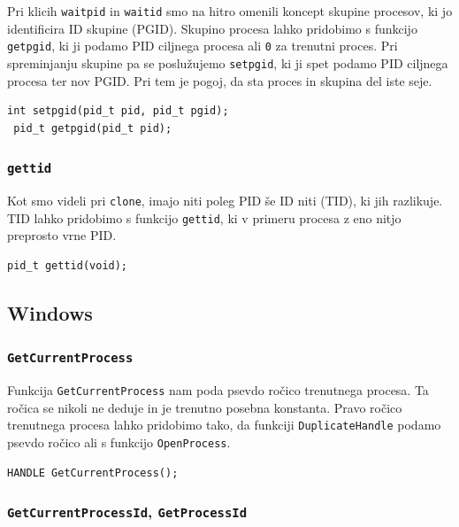 \documentclass[a4paper,12pt,openright]{book}
\begin{document}
Pri klicih \texttt{waitpid} in \texttt{waitid} smo na hitro omenili koncept skupine procesov, ki jo identificira ID skupine (PGID).
Skupino procesa lahko pridobimo s funkcijo \texttt{getpgid}, ki ji podamo PID ciljnega procesa ali \texttt{0} za trenutni proces.
Pri spreminjanju skupine pa se poslužujemo \texttt{setpgid}, ki ji spet podamo PID ciljnega procesa ter nov PGID.
Pri tem je pogoj, da sta proces in skupina del iste seje.

\begin{lstlisting}[style=func]
 int setpgid(pid_t pid, pid_t pgid);
 pid_t getpgid(pid_t pid);
\end{lstlisting}

\subsubsection{\texttt{gettid}}

Kot smo videli pri \texttt{clone}, imajo niti poleg PID še ID niti (TID), ki jih razlikuje.
TID lahko pridobimo s funkcijo \texttt{gettid}, ki v primeru procesa z eno nitjo preprosto vrne PID.

\begin{lstlisting}[style=func]
 pid_t gettid(void);
\end{lstlisting}

\subsection{Windows}


\subsubsection{\texttt{GetCurrentProcess}}

Funkcija \texttt{GetCurrentProcess} nam poda psevdo ročico trenutnega procesa.
Ta ročica se nikoli ne deduje in je trenutno posebna konstanta.
Pravo ročico trenutnega procesa lahko pridobimo tako, da funkciji \texttt{DuplicateHandle} podamo psevdo ročico ali s funkcijo \texttt{OpenProcess}.

\begin{lstlisting}[style=func]
 HANDLE GetCurrentProcess();
\end{lstlisting}

\subsubsection{\texttt{GetCurrentProcessId}, \texttt{GetProcessId}}
\end{document}
